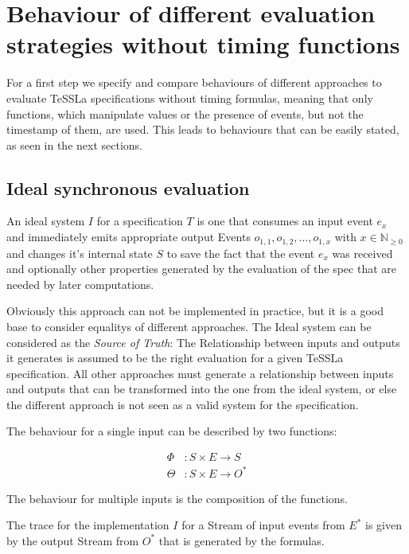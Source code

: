 \section{Behaviour of different evaluation strategies without timing functions}
\label{sec:system:behaviour_without_timing}

For a first step we specify and compare behaviours of different approaches to evaluate TeSSLa specifications without timing formulas,
meaning that only functions, which manipulate values or the presence of events, but not the timestamp of them, are used.
This leads to behaviours that can be easily stated, as seen in the next sections.

\subsection{Ideal synchronous evaluation}
\label{sec:system:behaviour_without_timing:ideal}

An ideal system \(I\) for a specification \(T\) is one that consumes an input event \(e_x\) and immediately emits
appropriate output Events \(o_{1,1}, o_{1,2}, \dots , o_{1,x}\) with \(x \in \mathbb{N}_{\ge0}\) and changes it's internal
state \(S\) to save the fact that the event \(e_x\) was received and optionally other properties generated by the
evaluation of the spec that are needed by later computations.

Obviously this approach can not be implemented in practice, but it is a good base to consider equalitys of different approaches.
The Ideal system can be considered as the \emph{Source of Truth}: The Relationship between inputs and outputs it generates
is assumed to be the right evaluation for a given TeSSLa specification.
All other approaches must generate a relationship between inputs and outputs that can be transformed into the one from the ideal system,
or else the different approach is not seen as a valid system for the specification.

The behaviour for a single input can be described by two functions:

\begin{align*}
  \Phi&: S \times E \rightarrow S \\
  \Theta&: S \times E \rightarrow O^*
\end{align*}

The behaviour for multiple inputs is the composition of the functions.

The trace for the implementation \(I\) for a Stream of input events from \(E^*\) is given by the output Stream
from \(O^*\) that is generated by the formulas.

